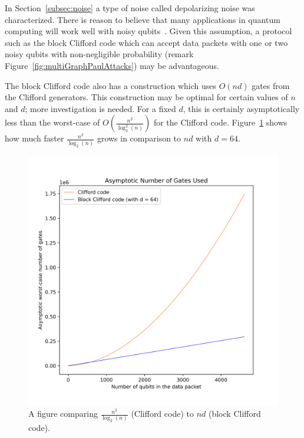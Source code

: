 In Section~\ref{subsec:noise} a type of noise called depolarizing noise was characterized. There is reason to believe that many applications in quantum computing will work well with noisy qubits~\cite{noisyQuantuamMachineLearning,sheldon2019quantum,rosch2022quantum,approximateQuantumComputing,noiseToTheirAdvantage}. Given this assumption, a protocol such as the block Clifford code which can accept data packets with one or two noisy qubits with non-negligible probability (remark Figure~\ref{fig:multiGraphPaulAttacks}) may be advantageous.

The block Clifford code also has a construction which uses $O\left(nd\right)$ gates from the Clifford generators. This construction may be optimal for certain values of $n$ and $d$; more investigation is needed. For a fixed $d$, this is certainly asymptotically less than the worst-case of $O\left(\frac{n^2}{\log_2^2 (n)}\right)$ for the Clifford code. Figure~\ref{fig:numberOfGatesComparison} shows how much faster $\frac{n^2}{\log_2 (n)}$ grows in comparison to $nd$ with $d= 64$.

\begin{figure}
    \centering
    \includegraphics[scale=0.6]{Figures/number_of_gates.png}
    \caption{A figure comparing $\frac{n^2}{\log_2 (n)}$ (Clifford code) to $nd$ (block Clifford code).}
    \label{fig:numberOfGatesComparison}
\end{figure}

